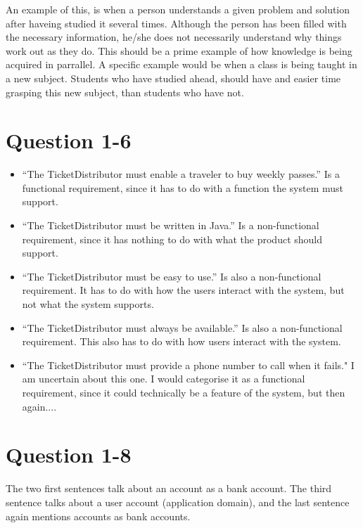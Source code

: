 \documentclass[10pt]{report}
\numberwithin{equation}{section} %
\numberwithin{figure}{section} %
\numberwithin{table}{section} %
\begin{document}
An example of this, is when a person understands a given problem and solution
after haveing studied it several times. Although the person has been filled
with the necessary information, he/she does not necessarily understand why
things work out as they do. This should be a prime example of how knowledge is
being acquired in parrallel. A specific example would be when a class is
being taught in a new subject. Students who have studied ahead, should have
and easier time grasping this new subject, than students who have not.

\section{Question 1-6}
\begin{itemize}
\item “The TicketDistributor must enable a traveler to buy weekly passes.”
    Is a functional requirement, since it has to do with a function the system
    must support.
\item “The TicketDistributor must be written in Java.” Is a non-functional
    requirement, since it has nothing to do with what the product should
    support.
\item “The TicketDistributor must be easy to use.” Is also a non-functional
    requirement. It has to do with how the users interact with the system, but
    not what the system supports.
\item “The TicketDistributor must always be available.” Is also a
    non-functional requirement. This also has to do with how users interact
    with the system.
\item “The TicketDistributor must provide a phone number to call when it
    fails." I am uncertain about this one. I would categorise it as a
    functional requirement, since it could technically be a feature of the
    system, but then again....
\end{itemize}

\section{Question 1-8}
The two first sentences talk about an account as a bank account. The third
sentence talks about a user account (application domain), and the last
sentence again mentions accounts as bank accounts.
\end{document}
